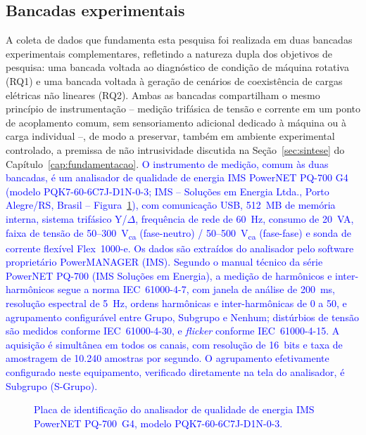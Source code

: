 \documentclass[times,final]{elsarticle}
\begin{document}
\subsection{Bancadas experimentais}
\label{sec:bancadas}
A coleta de dados que fundamenta esta pesquisa foi realizada em duas bancadas experimentais complementares, refletindo a natureza dupla dos objetivos de pesquisa: uma bancada voltada ao diagnóstico de condição de máquina rotativa (RQ1) e uma bancada voltada à geração de cenários de coexistência de cargas elétricas não lineares (RQ2). Ambas as bancadas compartilham o mesmo princípio de instrumentação -- medição trifásica de tensão e corrente em um ponto de acoplamento comum, sem sensoriamento adicional dedicado à máquina ou à carga individual --, de modo a preservar, também em ambiente experimental controlado, a premissa de não intrusividade discutida na Seção~\ref{sec:sintese} do Capítulo~\ref{cap:fundamentacao}. \textcolor{blue}{O instrumento de medição, comum às duas bancadas, é um analisador de qualidade de energia IMS PowerNET PQ-700 G4 (modelo PQK7-60-6C7J-D1N-0-3; IMS -- Soluções em Energia Ltda., Porto Alegre/RS, Brasil -- Figura~\ref{fig:placa_analisador}), com comunicação USB, 512~MB de memória interna, sistema trifásico Y/$\Delta$, frequência de rede de 60~Hz, consumo de 20~VA, faixa de tensão de 50--300~V\textsubscript{ca} (fase-neutro) / 50--500~V\textsubscript{ca} (fase-fase) e sonda de corrente flexível Flex~1000-e. Os dados são extraídos do analisador pelo software proprietário PowerMANAGER (IMS). \textcolor{blue}{Segundo o manual técnico da série PowerNET PQ-700 (IMS Soluções em Energia), a medição de harmônicos e inter-harmônicos segue a norma IEC~61000-4-7, com janela de análise de 200~ms, resolução espectral de 5~Hz, ordens harmônicas e inter-harmônicas de 0 a 50, e agrupamento configurável entre Grupo, Subgrupo e Nenhum; distúrbios de tensão são medidos conforme IEC~61000-4-30, e \textit{flicker} conforme IEC~61000-4-15. A aquisição é simultânea em todos os canais, com resolução de 16~bits e taxa de amostragem de 10.240 amostras por segundo. O agrupamento efetivamente configurado neste equipamento, verificado diretamente na tela do analisador, é Subgrupo (S-Grupo).}}

\begin{figure}[H]
    \centering
    \caption{\textcolor{blue}{Placa de identificação do analisador de qualidade de energia IMS PowerNET PQ-700~G4, modelo PQK7-60-6C7J-D1N-0-3.}}
    \label{fig:placa_analisador}
\end{figure}
\end{document}
